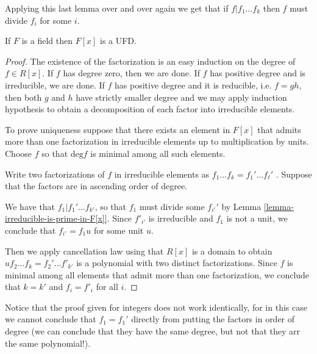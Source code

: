 Applying this last lemma over and over again we get that if $f|f_1\ldots f_k$
then $f$ must divide $f_i$ for some $i$.

\begin{lemma}
\label{lemma-polynomials-over-fields-are-UFD}
If $F$ is a field then $F[x]$ is a UFD.
\end{lemma}

\begin{proof}
The existence of the factorization is an easy induction on the degree of $f\in
R[x]$. If $f$ has degree zero, then we are done. If $f$ has positive degree and
is irreducible, we are done. If $f$ has positive degree and it is reducible,
i.e. $f=gh$, then both $g$ and $h$ have strictly smaller degree and we may apply
induction hypothesis to obtain a decomposition of each factor into irreducible
elements.

To prove uniqueness suppose that there exists an element in $F[x]$ that admits
more than one factorization in irreducible elements 
up to multiplication by units. Choose $f$ so that
$\text{deg}f$ is minimal among all such elements.

Write two factorizations of $f$ in irreducible elements as 
$f_1\ldots f_k=f_1'\ldots f_\ell'$ . Suppose that the factors are in
ascending order of degree.

We have that $f_1|f_1'\ldots f_{k'}$, so
that $f_1$ must divide some $f_{i'}'$ 
by Lemma \ref{lemma-irreducible-is-prime-in-F[x]}. 
Since $f'_{i'}$ is irreducible and $f_1$ is
not a unit, we conclude that $f_{i'}=f_1 u$ for some unit $u$.

Then we apply cancellation law using that $R[x]$ is a domain
to obtain $uf_2\ldots f_k=f_2'\ldots f'_{k'}$ is a
polynomial with two distinct factorizations.
Since $f$ is minimal among all
elements that admit more than one factorization, we conclude that $k=k'$ and
$f_i=f'_i$ for all $i$.
\end{proof}

\begin{remark}
\label{remark-not-the-same-as-in-Z}
Notice that the proof given for integers does not work identically,
for in this case we cannot conclude that $f_1=f_1'$ directly from putting the
factors in order of degree (we can conclude that they have the same degree, but
not that they arr the same polynomial!).
\end{remark}

